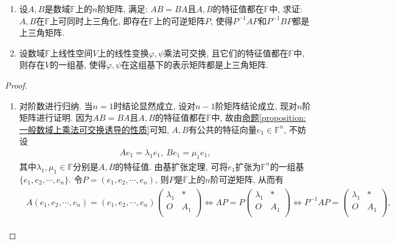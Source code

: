 \documentclass[../../main.tex]{subfiles}%
\begin{document}
\begin{proposition}\label{proposition:乘法可交换诱导同时上三角化}
\begin{enumerate}
\item 设\(A,B\)是数域\(\mathbb{F}\)上的\(n\)阶矩阵, 满足: \(AB = BA\)且\(A,B\)的特征值都在\(\mathbb{F}\)中, 求证: \(A,B\)在\(\mathbb{F}\)上可同时上三角化, 即存在\(\mathbb{F}\)上的可逆矩阵\(P\), 使得\(P^{-1}AP\)和\(P^{-1}BP\)都是上三角矩阵.

\item 设数域\(\mathbb{F}\)上线性空间\(V\)上的线性变换\(\varphi,\psi\)乘法可交换, 且它们的特征值都在\(\mathbb{F}\)中, 则存在\(V\)的一组基, 使得\(\varphi,\psi\)在这组基下的表示矩阵都是上三角矩阵. 
\end{enumerate}
\end{proposition}
\begin{proof}
\begin{enumerate}
\item 对阶数进行归纳. 当\(n = 1\)时结论显然成立, 设对\(n - 1\)阶矩阵结论成立, 现对\(n\)阶矩阵进行证明. 因为\(AB = BA\)且\(A,B\)的特征值都在\(\mathbb{F}\)中, 故由\hyperref[proposition:一般数域上乘法可交换诱导的性质]{命题\ref{proposition:一般数域上乘法可交换诱导的性质}}可知, \(A,B\)有公共的特征向量\(e_{1} \in \mathbb{F}^n\), 不妨设
\begin{align*}
Ae_{1}=\lambda_{1}e_{1},\ Be_{1}=\mu_{1}e_{1},
\end{align*}
其中\(\lambda_{1},\mu_{1} \in \mathbb{F}\)分别是\(A,B\)的特征值. 由基扩张定理, 可将\(e_{1}\)扩张为\(\mathbb{F}^n\)的一组基\(\{e_{1},e_{2},\cdots ,e_{n}\}\). 令\(P=(e_{1},e_{2},\cdots ,e_{n})\), 则\(P\)是\(\mathbb{F}\)上的\(n\)阶可逆矩阵, 从而有
\begin{align}\label{proposition-07-1.1}
\begin{aligned}
A\left( e_1,e_2,\cdots ,e_n \right) =\left( e_1,e_2,\cdots ,e_n \right) \left( \begin{matrix}
\lambda _1&		*\\
O&		A_1\\
\end{matrix} \right) \iff AP=P\left( \begin{matrix}
\lambda _1&		*\\
O&		A_1\\
\end{matrix} \right) \iff P^{-1}AP=\left( \begin{matrix}
\lambda _1&		*\\
O&		A_1\\
\end{matrix} \right) ,

\end{aligned}
\end{align}
\end{enumerate}
\end{proof}
\end{document}
